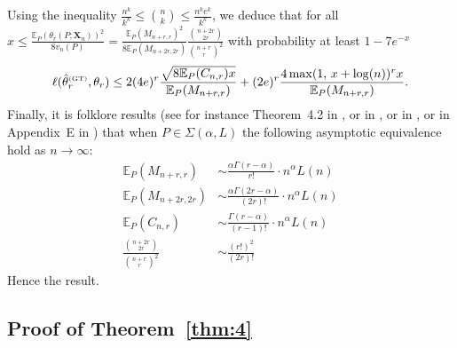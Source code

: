 \documentclass{article}
\newcommand{\1}{\boldsymbol{1}}
\newcommand{\EE}{\mathbb{E}}
\theoremstyle{plain}
\begin{document}
  Using the inequality $\frac{n^k}{k^k} \leq \binom{n}{k} \leq \frac{n^ke^k}{k^k}$, we deduce that for all $x \leq \frac{\EE_P(\theta_r(P;\mathbf{X}_n))^2}{8 v_n(P)} = \frac{\EE_P(M_{n+r,r})^2}{8\EE_P(M_{n+2r,2r})}\frac{\binom{n+2r}{2r}}{\binom{n+r}{r}^2}$ with probability at least $1-7e^{-x}$
  \begin{equation}
    \label{eq:59jul}
    \ell(\hat{\theta}_r^{\text{\tiny{(GT)}}},\theta_r)%
    \leq%
    2(4e)^r\frac{\sqrt{8\EE_P(C_{n,r})x}}{\EE_P(M_{n+r,r})}%
    + (2e)^r\frac{4\max(1,\,x+\log(n))^rx}{\EE_P(M_{n+r,r})}.
  \end{equation}
      Finally, it is folklore results (see for instance Theorem~4.2 in \cite{Ben(17)}, or in \cite{Kar(67)}, or in \cite{Gne(07)}, or in Appendix~E in \cite{Fav(22)}) that when $P\in \Sigma(\alpha,L)$ the following asymptotic equivalence hold as $n\to \infty$:
  \begin{align*}
    \EE_P(M_{n+r,r}) &\sim \frac{\alpha \Gamma(r - \alpha)}{r!}\cdot n^{\alpha}L(n) \\
    \EE_P(M_{n+2r,2r}) &\sim \frac{\alpha \Gamma(2r - \alpha)}{(2r)!}\cdot n^{\alpha}L(n)\\
    \EE_P(C_{n,r}) &\sim \frac{\Gamma(r - \alpha)}{(r-1)!}\cdot n^{\alpha}L(n) \\
    \frac{\binom{n+2r}{2r}}{\binom{n+r}{r}^2}%
    &\sim \frac{(r!)^2}{(2r)!}
  \end{align*}
 Hence the result.



\subsection{Proof of Theorem~\ref{thm:4}}
\label{sec:proof-thm:4}
\end{document}
